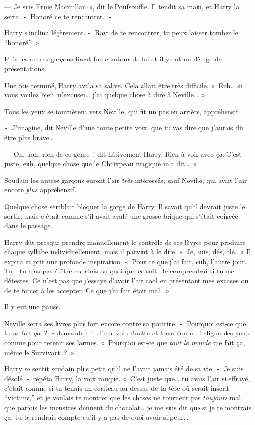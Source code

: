 --- Je suis Ernie Macmillan~», dit le Poufsouffle.
Il tendit sa main, et Harry la serra.
«~Honoré de te rencontrer.~»

Harry s'inclina légèrement.
«~Ravi de te rencontrer, tu peux laisser tomber le “honoré.”~»

Puis les autres garçons firent foule autour de lui et il y eut un déluge de présentations.

Une fois terminé, Harry avala sa salive.
Cela allait être très difficile.
«~Euh… si vous voulez bien m'excuser… j'ai quelque chose à dire à Neville…~»

Tous les yeux se tournèrent vers Neville, qui fit un pas en arrière, appréhensif.

«~J'imagine, dit Neville d'une toute petite voix, que tu vas dire que j'aurais dû être plus brave…

--- Oh, non, rien de ce genre~! dit hâtivement Harry.
Rien à voir avec \emph{ça}.
C'est juste, euh, quelque chose que le Choixpeau magique m'a dit…~»

Soudain les autres garçons eurent l'air \emph{très} intéressés, sauf Neville, qui avait l'air encore \emph{plus} appréhensif.

Quelque chose semblait bloquer la gorge de Harry.
Il savait qu'il devrait juste le sortir, mais c'était comme s'il avait avalé une grosse brique qui s'était coincée dans le passage.

Harry dût presque prendre manuellement le contrôle de ses lèvres pour produire chaque syllabe individuellement, mais il parvint à le dire.
«~Je, suis, dés, olé.~»
Il expira et prit une profonde inspiration.
«~Pour ce que j'ai fait, euh, l'autre jour.
Tu… tu n'as pas à être courtois ou quoi que ce soit.
Je comprendrai si tu me détestes.
Ce n'est pas que j'essaye d'avoir l'air cool en présentant mes excuses ou de te forcer à les accepter.
Ce que j'ai fait était mal.~»

Il y eut une pause.

Neville serra ses livres plus fort encore contre sa poitrine.
«~Pourquoi est-ce que tu as fait ça~?~» demanda-t-il d'une voix fluette et tremblante.
Il cligna des yeux comme pour retenir ses larmes.
«~Pourquoi est-ce que \emph{tout le monde} me fait ça, même le Survivant~?~»

Harry se sentit soudain plus petit qu'il ne l'avait jamais été de sa vie.
«~Je suis désolé~», répéta Harry, la voix rauque.
«~C'est juste que… tu avais l'air si effrayé, c'était comme si tu tenais un écriteau au-dessus de ta tête où serait inscrit “victime,” et je voulais te montrer que les choses ne tournent pas \emph{toujours} mal, que parfois les monstres donnent du chocolat… je me suis dit que si je te montrais ça, tu te rendrais compte qu'il y a pas de quoi avoir si peur…

